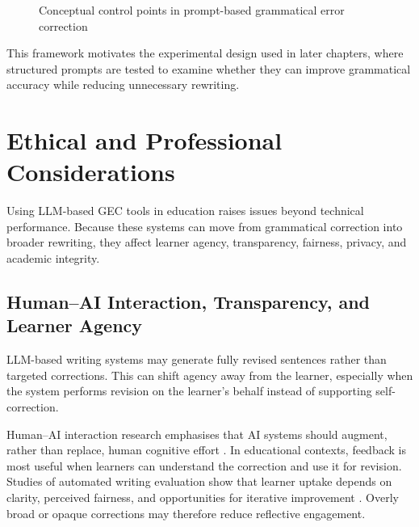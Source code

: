 \begin{figure}[htbp]
\centering
{}
\caption{Conceptual control points in prompt-based grammatical error correction}
\label{fig:prompt_pipeline}
\end{figure}

This framework motivates the experimental design used in later chapters, where structured prompts are tested to examine whether they can improve grammatical accuracy while reducing unnecessary rewriting.

\section{Ethical and Professional Considerations}

Using LLM-based GEC tools in education raises issues beyond technical performance. Because these systems can move from grammatical correction into broader rewriting, they affect learner agency, transparency, fairness, privacy, and academic integrity.

\subsection{Human--AI Interaction, Transparency, and Learner Agency}

LLM-based writing systems may generate fully revised sentences rather than targeted corrections. This can shift agency away from the learner, especially when the system performs revision on the learner's behalf instead of supporting self-correction.

Human--AI interaction research emphasises that AI systems should augment, rather than replace, human cognitive effort \cite{amershi2019guidelines}. In educational contexts, feedback is most useful when learners can understand the correction and use it for revision. Studies of automated writing evaluation show that learner uptake depends on clarity, perceived fairness, and opportunities for iterative improvement \cite{ke2019automated}. Overly broad or opaque corrections may therefore reduce reflective engagement.


